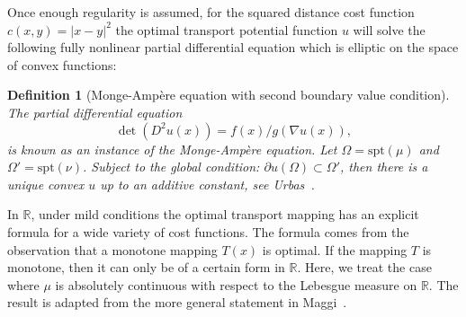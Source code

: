 \documentclass{amsart}
\theoremstyle{lemma}
\newtheorem{definition}[theorem]{Definition}
\newtheorem{remark}[theorem]{Remark}
\theoremstyle{remark}
\begin{document}
Once enough regularity is assumed, for the squared distance cost function $c(x,y) = \vert x - y \vert^2$ the optimal transport potential function $u$ will solve the following fully nonlinear partial differential equation which is elliptic on the space of convex functions:
\begin{definition}[Monge-Amp\`{e}re equation with second boundary value condition]
The partial differential equation
\begin{equation}
\det(D^2 u(x)) = f(x)/g(\nabla u(x)),
\end{equation}
is known as an instance of the Monge-Amp\`{e}re equation. Let $\Omega = \text{spt}(\mu)$ and $\Omega ' = \text{spt}(\nu)$. Subject to the global condition: $\partial u(\Omega) \subset \Omega '$, then there is a unique convex $u$ up to an additive constant, see Urbas~\cite{Urbas}.
\end{definition}

In $\mathbb{R}$, under mild conditions the optimal transport mapping has an explicit formula for a wide variety of cost functions. The formula comes from the observation that a monotone mapping $T(x)$ is optimal. If the mapping $T$ is monotone, then it can only be of a certain form in $\mathbb{R}$. Here, we treat the case where $\mu$ is absolutely continuous with respect to the Lebesgue measure on $\mathbb{R}$. The result is adapted from the more general statement in Maggi~\cite{maggi}.
\end{document}
